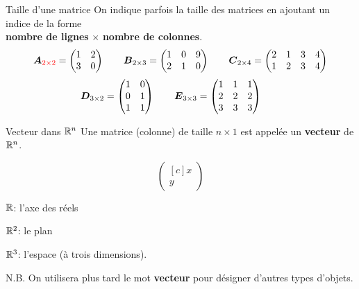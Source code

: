 \documentclass[french]{beamer}
\begin{document}
	\begin{frame}{Taille d'une matrice}
	On indique parfois la taille des matrices en ajoutant un indice de la forme\\
	\textbf{nombre de lignes} $\times$ \textbf{nombre de colonnes}.
		\[
\boldsymbol{A}_{\color{red}2\times2} = \begin{pmatrix}
1 & 2 \\
3 & 0 
\end{pmatrix} \qquad 
\boldsymbol{B}_{2\times3} = \begin{pmatrix}
1 & 0 & 9 \\
2 & 1 & 0 
\end{pmatrix} \qquad
\boldsymbol{C}_{2\times4} = \begin{pmatrix}
2 & 1 & 3 & 4\\
1 & 2 & 3 & 4
\end{pmatrix} \]
\[
\boldsymbol{D}_{3\times2} = \begin{pmatrix}
1 & 0  \\
0 & 1  \\
1 & 1
\end{pmatrix} \qquad
\boldsymbol{E}_{3\times3} = \begin{pmatrix}
1 & 1 & 1 \\
2 & 2 & 2 \\
3 & 3 & 3
\end{pmatrix} \qquad
	\]
\end{frame}		
		
\begin{frame}{Vecteur dans $\mathbb{R}^n$}
Une matrice (colonne) de taille $n\times 1$ est appelée un \textbf{vecteur} de $\mathbb{R}^n$.

\[
\begin{pmatrix}[c] x\\y
\end{pmatrix}
\]

$\mathbb{R}$: l'axe des réels

$\mathbb{R}^2$: le plan

$\mathbb{R}^3$: l'espace (à trois dimensions).

\vfill
N.B. On utilisera plus tard le mot \textbf{vecteur} pour désigner d'autres types d'objets.

\end{frame}
	
\end{document}
